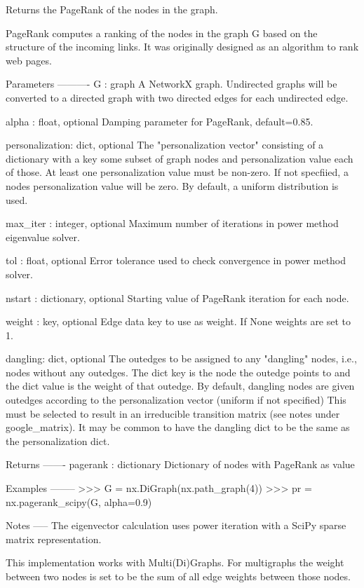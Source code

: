 \begin{DoxyVerb}Returns the PageRank of the nodes in the graph.

PageRank computes a ranking of the nodes in the graph G based on
the structure of the incoming links. It was originally designed as
an algorithm to rank web pages.

Parameters
----------
G : graph
  A NetworkX graph.  Undirected graphs will be converted to a directed
  graph with two directed edges for each undirected edge.

alpha : float, optional
  Damping parameter for PageRank, default=0.85.

personalization: dict, optional
  The "personalization vector" consisting of a dictionary with a
  key some subset of graph nodes and personalization value each of those.
  At least one personalization value must be non-zero.
  If not specfiied, a nodes personalization value will be zero.
  By default, a uniform distribution is used.

max_iter : integer, optional
  Maximum number of iterations in power method eigenvalue solver.

tol : float, optional
  Error tolerance used to check convergence in power method solver.

nstart : dictionary, optional
  Starting value of PageRank iteration for each node.

weight : key, optional
  Edge data key to use as weight.  If None weights are set to 1.

dangling: dict, optional
  The outedges to be assigned to any "dangling" nodes, i.e., nodes without
  any outedges. The dict key is the node the outedge points to and the dict
  value is the weight of that outedge. By default, dangling nodes are given
  outedges according to the personalization vector (uniform if not
  specified) This must be selected to result in an irreducible transition
  matrix (see notes under google_matrix). It may be common to have the
  dangling dict to be the same as the personalization dict.

Returns
-------
pagerank : dictionary
   Dictionary of nodes with PageRank as value

Examples
--------
>>> G = nx.DiGraph(nx.path_graph(4))
>>> pr = nx.pagerank_scipy(G, alpha=0.9)

Notes
-----
The eigenvector calculation uses power iteration with a SciPy
sparse matrix representation.

This implementation works with Multi(Di)Graphs. For multigraphs the
weight between two nodes is set to be the sum of all edge weights
between those nodes.


\end{DoxyVerb}
